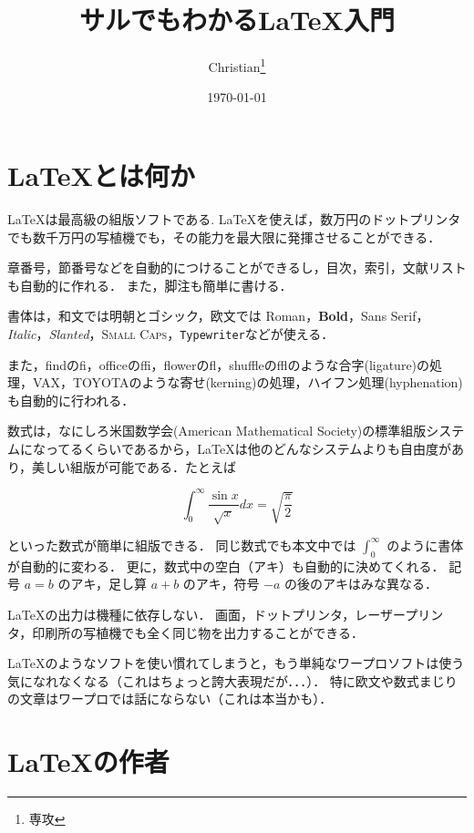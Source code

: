 \documentclass[a4j]{jarticle}
\begin{document}
\title{サルでもわかる\LaTeX 入門}
\author{Christian\thanks{専攻}}
\date{\today}

\maketitle

\section{\LaTeX とは何か}

\LaTeX は最高級の組版ソフトである. \LaTeX を使えば，数万円のドットプリンタでも数千万円の写植機でも，その能力を最大限に発揮させることができる．



章番号，節番号などを自動的につけることができるし，目次，索引，文献リストも自動的に作れる．
また，脚注も簡単に書ける．

書体は，和文では明朝とゴシック，欧文では Roman，\textbf{Bold}，\textsf{Sans Serif}，\textit{Italic}，\textsl{Slanted}，\textsc{Small Caps}，\texttt{Typewriter}などが使える．

また，findのfi，officeのffi，flowerのfl，shuffleのfflのような合字(ligature)の処理，VAX，TOYOTAのような寄せ(kerning)の処理，ハイフン処理(hyphenation)も自動的に行われる．

数式は，なにしろ米国数学会(American Mathematical Society)の標準組版システム\cite{Rate06}になってるくらいであるから，\LaTeX は他のどんなシステムよりも自由度があり，美しい組版が可能である．たとえば

  \[ \int_0^\infty \frac{\sin x}{\sqrt{x}}dx
    = \sqrt{\frac{\pi}{2}} \]

といった数式が簡単に組版できる．
同じ数式でも本文中では $\int_0^\infty$ のように書体が自動的に変わる．
更に，数式中の空白（アキ）も自動的に決めてくれる．
記号 $a=b$ のアキ，足し算 $a+b$ のアキ，符号 $-a$ の後のアキはみな異なる．

\LaTeX の出力は機種に依存しない．
画面，ドットプリンタ，レーザープリンタ，印刷所の写植機でも全く同じ物を出力することができる\cite{HM99}．

\LaTeX のようなソフトを使い慣れてしまうと，もう単純なワープロソフトは使う気になれなくなる（これはちょっと誇大表現だが．．．）．
特に欧文や数式まじりの文章はワープロでは話にならない（これは本当かも）．

\section{\LaTeX の作者}
\end{document}
